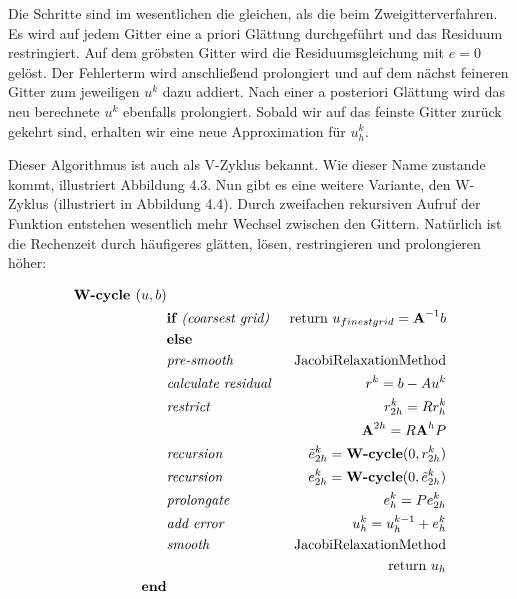 Die Schritte sind im wesentlichen die gleichen, als die beim Zweigitterverfahren. Es wird auf jedem Gitter eine a priori Glättung durchgeführt und das Residuum restringiert. Auf dem gröbsten Gitter wird die Residuumsgleichung mit $e = 0$ gelöst. Der Fehlerterm wird anschließend prolongiert und auf dem nächst feineren Gitter zum jeweiligen $u^{k}$ dazu addiert. Nach einer a posteriori Glättung wird das neu berechnete $u^{k}$ ebenfalls prolongiert. Sobald wir auf das feinste Gitter zurück gekehrt sind, erhalten wir eine neue Approximation für $u_{h}^{k}$.

 \label{V-Cycle}

Dieser Algorithmus ist auch als V-Zyklus bekannt. Wie dieser Name zustande kommt, illustriert Abbildung 4.3. Nun gibt es eine weitere Variante, den W-Zyklus (illustriert in Abbildung 4.4). Durch zweifachen rekursiven Aufruf der Funktion entstehen wesentlich mehr Wechsel zwischen den Gittern. Natürlich ist die Rechenzeit durch häufigeres glätten, lösen, restringieren und prolongieren höher:

\begin{eqnarray}
\textbf{W-cycle }(u,b)                         & \notag \\
&\textbf{if }\textit{(coarsest grid) }&\textnormal{return } u_{finest grid}={\textbf{A}}^{-1}b \notag \\
&\textbf{else }                                                & \notag \\
&\textit{pre-smooth }                                 &\textnormal{JacobiRelaxationMethod} \notag \\
&\textit{calculate residual }                &r^{k} = b - Au^{k} \notag \\
&\textit{restrict }                                 &r^{k}_{2h}=Rr^{k}_{h} \notag \\
&                                                                        &{\textbf{A}}^{2h} = R{\textbf{A}}^{h}P \notag \\
&\textit{recursion }                                &\tilde e^{k}_{2h} = \textbf{W-cycle}(0,r^{k}_{2h}) \notag \\
&\textit{recursion }                                &e^{k}_{2h} = \textbf{W-cycle}(0,\tilde e^{k}_{2h}) \notag \\
&\textit{prolongate }                                &e^{k}_{h} = Pe^{k}_{2h} \notag \\
&\textit{add error }                                &u^{k}_{h} = u^{k-1}_{h} + e^{k}_{h} \notag \\
&\textit{smooth }                                        &\textnormal{JacobiRelaxationMethod} \notag \\
&                                                                        &\textnormal{return } u_{h} \notag \\
\textbf{end}                                                & \notag
\end{eqnarray}

